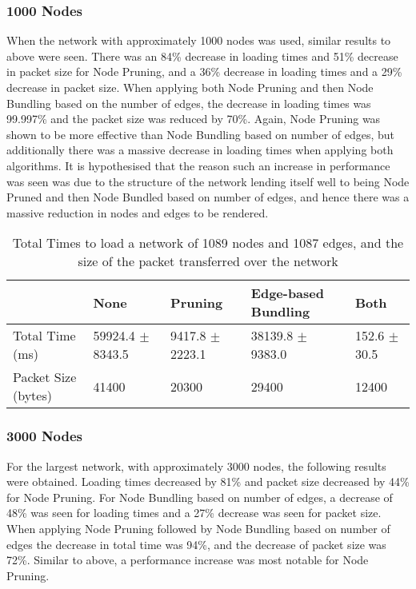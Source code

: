 \documentclass[../dissertation.tex]{subfiles}
\begin{document}
\subsubsection{1000 Nodes}

When the network with approximately 1000 nodes was used, similar results to above were seen. There was an 84\% decrease in loading times and 51\% decrease in packet size for Node Pruning, and a 36\% decrease in loading times and a 29\% decrease in packet size. When applying both Node Pruning and then Node Bundling based on the number of edges, the decrease in loading times was 99.997\% and the packet size was reduced by 70\%. Again, Node Pruning was shown to be more effective than Node Bundling based on number of edges, but additionally there was a massive decrease in loading times when applying both algorithms. It is hypothesised that the reason such an increase in performance was seen was due to the structure of the network lending itself well to being Node Pruned and then Node Bundled based on number of edges, and hence there was a massive reduction in nodes and edges to be rendered.

\begin{table}[H]
\centering
\begin{tabular}{|l|l|l|l|l|}
\hline
                    & \textbf{None}        & \textbf{Pruning}    & \textbf{Edge-based Bundling}        & \textbf{Both}    \\ \hline
Total Time (ms)     & 59924.4 $\pm$ 8343.5 & 9417.8 $\pm$ 2223.1 & 38139.8 $\pm$ 9383.0 & 152.6 $\pm$ 30.5 \\ \hline
Packet Size (bytes) & 41400                & 20300               & 29400                & 12400            \\ \hline
\end{tabular}
\caption{Total Times to load a network of 1089 nodes and 1087 edges, and the size of the packet transferred over the network}
\label{table:1000-nodes}
\end{table}

\subsubsection{3000 Nodes}

For the largest network, with approximately 3000 nodes, the following results were obtained. Loading times decreased by 81\% and packet size decreased by 44\% for Node Pruning. For Node Bundling based on number of edges, a decrease of 48\% was seen for loading times and a 27\% decrease was seen for packet size. When applying Node Pruning followed by Node Bundling based on number of edges the decrease in total time was 94\%, and the decrease of packet size was 72\%. Similar to above, a performance increase was most notable for Node Pruning. 
\end{document}
